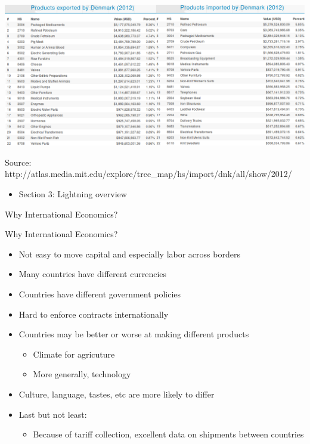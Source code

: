 \documentclass[ignorenonframetext,]{beamer}
\begin{document}
\begin{frame}

    \includegraphics[scale=0.28]{Denmark_disaggregated_trade.png}
    
    {\tiny Source: http://atlas.media.mit.edu/explore/tree\_map/hs/import/dnk/all/show/2012/}

\end{frame}

\begin{frame}

    \begin{itemize}
        \item Section 3: Lightning overview
    \end{itemize}

\end{frame}

\begin{frame}{Why International Economics?}
\end{frame}


\begin{frame}{Why International Economics?}

    \begin{itemize}
        \item Not easy to move capital and especially labor across borders
        \item Many countries have different currencies
        \item Countries have different government policies 
        \item Hard to enforce contracts internationally
        \item Countries may be better or worse at making different products 
        \begin{itemize}
            \item Climate for agricuture
            \item More generally, technology
        \end{itemize}
        \item Culture, language, tastes, etc are more likely to differ
        \item Last but not least:
        \begin{itemize}
            \item Because of tariff collection, excellent data on shipments between countries
        \end{itemize}
    \end{itemize}
\end{frame}
    
\end{document}
